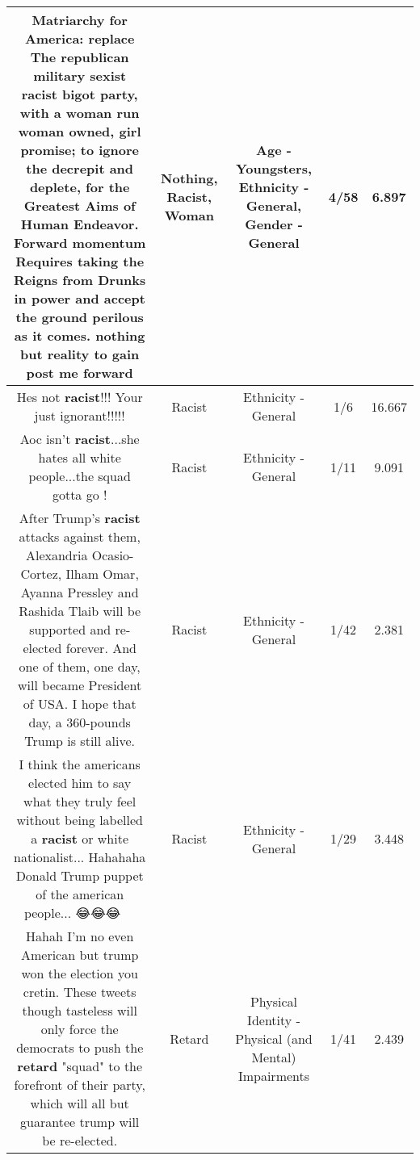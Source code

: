 \documentclass[11pt]{article}
\newlength\mylength
\begin{document}
\begin{center}
\begin{longtable}{|C{.65\mylength}|C{.30\mylength}|C{.12\mylength}|C{.12\mylength}|C{.12\mylength}|}
  \small Matriarchy for America: replace The republican military sexist \textbf{racist} bigot party, with a \textbf{woman} run \textbf{woman} owned, girl promise; to ignore the decrepit and deplete, for the Greatest Aims of Human Endeavor. Forward momentum  Requires taking the Reigns from Drunks in power and accept the ground perilous as it comes.  \textbf{nothing} but reality to gain post me forward\normalsize   & Nothing, Racist, Woman & Age - Youngsters, Ethnicity - General, Gender - General & 4/58 & 6.897 \\  \hline
  \small Hes not \textbf{racist}!!! Your just ignorant!!!!!\normalsize   & Racist & Ethnicity - General & 1/6 & 16.667 \\  \hline
  \small Aoc isn't \textbf{racist}...she hates all white people...the squad gotta go !\normalsize   & Racist & Ethnicity - General & 1/11 & 9.091 \\  \hline
  \small After Trump's \textbf{racist} attacks against them, Alexandria Ocasio-Cortez,  Ilham Omar, Ayanna Pressley and Rashida Tlaib will be supported and re-elected forever. And one of them, one day, will became President of USA. I hope that day, a 360-pounds Trump is still alive.\normalsize   & Racist & Ethnicity - General & 1/42 & 2.381 \\  \hline
  \small I think the americans elected him to say what they truly feel without being labelled a \textbf{racist} or white nationalist... Hahahaha Donald Trump puppet of the american people... 😂😂😂🤣🤣🤣🤣\normalsize   & Racist & Ethnicity - General & 1/29 & 3.448 \\  \hline
  \small Hahah I'm no even American but trump won the election you cretin. These tweets though tasteless will only force the democrats to push the \textbf{retard} "squad" to the forefront of their party, which will all but guarantee trump will be re-elected.\normalsize   & Retard & Physical Identity - Physical (and Mental) Impairments & 1/41 & 2.439 \\  \hline

\end{longtable}
\end{center}
\end{document}
